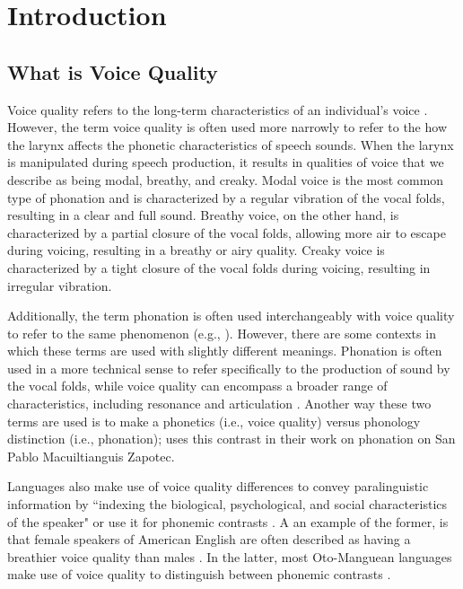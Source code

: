 \chapter{Introduction} \label{chap:introduction}


\section{What is Voice Quality} \label{sec:voice_quality}
Voice quality refers to the long-term characteristics of an individual's voice \citep{abercrombieElementsGeneralPhonetics1967,laverPhoneticDescriptionVoice1980}. However, the term voice quality is often used more narrowly to refer to the how the larynx affects the phonetic characteristics of speech sounds. When the larynx is manipulated during speech production, it results in qualities of voice that we describe as being modal, breathy, and creaky. Modal voice is the most common type of phonation and is characterized by a regular vibration of the vocal folds, resulting in a clear and full sound. Breathy voice, on the other hand, is characterized by a partial closure of the vocal folds, allowing more air to escape during voicing, resulting in a breathy or airy quality. Creaky voice is characterized by a tight closure of the vocal folds during voicing, resulting in irregular vibration.

Additionally, the term phonation is often used interchangeably with voice quality to refer to the same phenomenon (e.g., \cite{keatingPhonationContrastsLanguages}). However, there are some contexts in which these terms are used with slightly different meanings. Phonation is often used in a more technical sense to refer specifically to the production of sound by the vocal folds, while voice quality can encompass a broader range of characteristics, including resonance and articulation \citep{eslingVoiceQualityLaryngeal2019}. Another way these two terms are used is to make a phonetics (i.e., voice quality) versus phonology distinction (i.e., phonation); \citet{barzilaiContextdependentPhoneticEnhancement2021} uses this contrast in their work on phonation on San Pablo Macuiltianguis Zapotec. 

Languages also make use of voice quality differences to convey paralinguistic information by ``indexing the biological, psychological, and social characteristics of the speaker" \citep{laverVoiceQualityIndexical1968,podesvaStanceWindowLanguageRace2016} or use it for phonemic contrasts \citep{ladefogedSoundsWorldsLanguages1996}. A an example of the former, is that female speakers of American English are often described as having a breathier voice quality than males \citep[e.g.,][]{klattAnalysisSynthesisPerception1990}. In the latter, most Oto-Manguean languages make use of voice quality to distinguish between phonemic contrasts \citep{lillehaugenOtomangueanLanguages2019}. 


